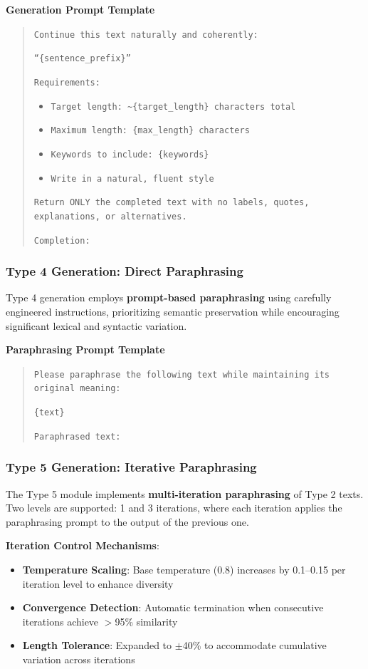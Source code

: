 \noindent\textbf{Generation Prompt Template}
\begin{quote}
\small
\texttt{Continue this text naturally and coherently:}

\texttt{``\{sentence\_prefix\}''}

\texttt{Requirements:}
\begin{itemize}[nosep,leftmargin=1em]
    \item \texttt{Target length: \textasciitilde\{target\_length\} characters total}
    \item \texttt{Maximum length: \{max\_length\} characters}
    \item \texttt{Keywords to include: \{keywords\}}
    \item \texttt{Write in a natural, fluent style}
\end{itemize}

\texttt{Return ONLY the completed text with no labels, quotes, explanations, or alternatives.}

\texttt{Completion:}
\end{quote}

\subsubsection{Type 4 Generation: Direct Paraphrasing}
Type 4 generation employs \textbf{prompt-based paraphrasing} using carefully engineered instructions, prioritizing semantic preservation while encouraging significant lexical and syntactic variation.

\noindent\textbf{Paraphrasing Prompt Template}
\begin{quote}
\small
\texttt{Please paraphrase the following text while maintaining its original meaning:}

\texttt{\{text\}}

\texttt{Paraphrased text:}
\end{quote}

\subsubsection{Type 5 Generation: Iterative Paraphrasing}
The Type 5 module implements \textbf{multi-iteration paraphrasing} of Type 2 texts. Two levels are supported: 1 and 3 iterations, where each iteration applies the paraphrasing prompt to the output of the previous one.

\textbf{Iteration Control Mechanisms}:
\begin{itemize}
    \item \textbf{Temperature Scaling}: Base temperature (0.8) increases by 0.1--0.15 per iteration level to enhance diversity
    \item \textbf{Convergence Detection}: Automatic termination when consecutive iterations achieve $>$95\% similarity
    \item \textbf{Length Tolerance}: Expanded to $\pm$40\% to accommodate cumulative variation across iterations
\end{itemize}

